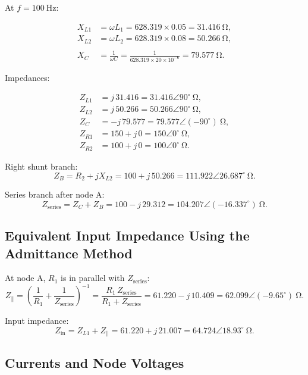 \documentclass{article}
\begin{document}
At $f = \qty{100}{\hertz}$:

\[
\begin{aligned}
X_{L1} &= \omega L_1 = 628.319 \times 0.05 = \qty{31.416}{\ohm},\\
X_{L2} &= \omega L_2 = 628.319 \times 0.08 = \qty{50.266}{\ohm},\\
\\
X_{C}  &= \frac{1}{\omega C} = \frac{1}{628.319 \times 20 \times 10^{-6}} = \qty{79.577}{\ohm}.
\end{aligned}
\]

Impedances:

\[
\begin{aligned}
Z_{L1} &= j\,31.416 = 31.416\angle 90^\circ\ \si{\ohm},\\
Z_{L2} &= j\,50.266 = 50.266\angle 90^\circ\ \si{\ohm},\\
Z_C &= -j\,79.577 = 79.577\angle(-90^\circ)\ \si{\ohm},\\
Z_{R1} &= 150 + j\,0 = 150\angle 0^\circ\ \si{\ohm},\\
Z_{R2} &= 100 + j\,0 = 100\angle 0^\circ\ \si{\ohm}.
\end{aligned}
\]

Right shunt branch:
\[
Z_{B} = R_2 + jX_{L2} = 100 + j\,50.266 = 111.922\angle 26.687^\circ\ \si{\ohm}.
\]

Series branch after node A:
\[
Z_{\text{series}} = Z_C + Z_B = 100 - j\,29.312 = 104.207\angle(-16.337^\circ)\ \si{\ohm}.
\]


\subsection{Equivalent Input Impedance Using the Admittance Method}

At node A, $R_1$ is in parallel with $Z_{\text{series}}$:
\[
Z_{\parallel} = \left( \frac{1}{R_1} + \frac{1}{Z_{\text{series}}} \right)^{-1}
= \frac{R_1\,Z_{\text{series}}}{R_1 + Z_{\text{series}}}
= 61.220 - j\,10.409 = 62.099\angle(-9.65^\circ)\ \si{\ohm}.
\]

Input impedance:
\[
Z_{\text{in}} = Z_{L1} + Z_{\parallel}
= 61.220 + j\,21.007 = 64.724\angle 18.93^\circ\ \si{\ohm}.
\]

\subsection{Currents and Node Voltages}
\end{document}
